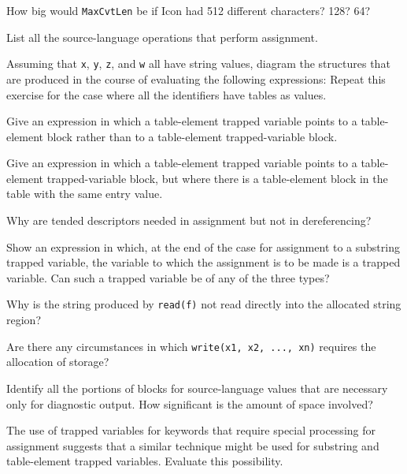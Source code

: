  How big would \texttt{MaxCvtLen} be if Icon had 512
different characters?  128? 64?

 List all the source-language operations that
perform assignment.

 Assuming that \texttt{x}, \texttt{y}, \texttt{z},
and \texttt{w} all have string values, diagram the structures that are
produced in the course of evaluating the following expressions:
Repeat this exercise for the case where all the identifiers have tables as values.

 Give an expression in which a table-element
trapped variable points to a table-element block rather than to a
table-element trapped-variable block.

 Give an expression in which a table-element
trapped variable points to a table-element trapped-variable block, but
where there is a table-element block in the table with the same entry
value.

Why are tended descriptors needed in assignment but not in dereferencing?

 Show an expression in which, at the end of the case for
assignment to a substring trapped variable, the variable to which the
assignment is to be made is a trapped variable. Can such a trapped
variable be of any of the three types?

 Why is the string produced by \texttt{read(f)}
not read directly into the allocated string region?

 Are there any circumstances in which
\texttt{write(x1, x2, ..., xn)} requires the allocation of storage?

 Identify all the portions of blocks for
source-language values that are necessary only for diagnostic
output. How significant is the amount of space involved?

 The use of trapped variables for keywords that
require special processing for assignment suggests that a similar
technique might be used for substring and table-element trapped
variables. Evaluate this possibility.
